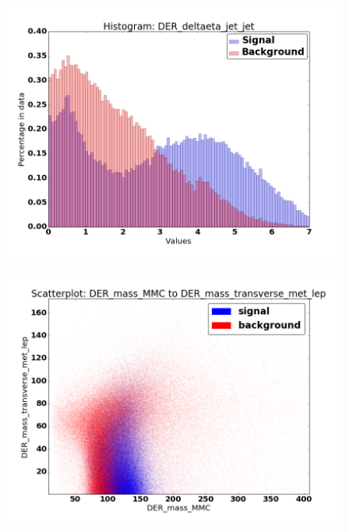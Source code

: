 \begin{figure}
\centering
\begin{minipage}{.5\textwidth}
  \centering
  \includegraphics[width=\linewidth]{images/hist_DER_deltaeta_jet_jet}
  \label{fig:hist1}
\end{minipage}%
\begin{minipage}{.5\textwidth}
  \centering
  \includegraphics[width=\linewidth]{images/scat_DER_mass_MMCtoDER_mass_transverse_met_lep}
  \label{fig:scat1}
\end{minipage}
\end{figure}